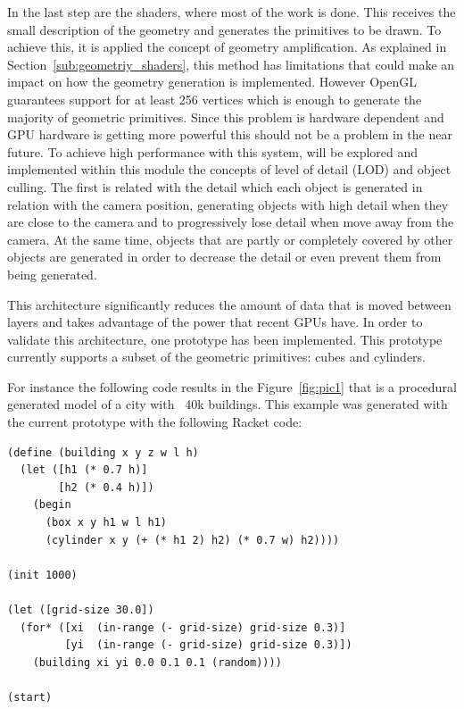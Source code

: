 In the last step are the shaders, where most of the work is done. This receives the small description of the geometry and generates the primitives to be
drawn. To achieve this, it is applied the concept of geometry amplification. As explained in Section~\ref{sub:geometriy_shaders}, this method has
limitations that could make an impact on how the geometry generation is implemented. However OpenGL guarantees support for at least 256 vertices which
is enough to generate the majority of geometric primitives. Since this problem is hardware dependent and GPU hardware is getting more powerful this
should not be a problem in the near future. 
To achieve high performance with this system, will be explored and implemented within this module the concepts of level of detail (LOD) and object
culling. The first is related with the detail which each object is generated in relation with the camera position, generating  objects with high detail
when they are close to the camera and to progressively lose detail when move away from the camera.  At the same time, objects that are partly or
completely covered by other objects are generated in order to decrease the detail or even prevent them from being generated.

This architecture significantly reduces the amount of data that is moved between layers and takes advantage of the power that recent GPUs have. 
In order to validate this architecture, one prototype has been implemented. This prototype currently supports a subset of the geometric primitives: cubes and cylinders.

For instance the following code results in the Figure~\ref{fig:pic1} that is a procedural generated model of a city with ~40k buildings. This example
was generated with the current prototype with the following Racket code:



\lstset{style=racket}
\begin{lstlisting}
(define (building x y z w l h)
  (let ([h1 (* 0.7 h)]
        [h2 (* 0.4 h)])
    (begin
      (box x y h1 w l h1)
      (cylinder x y (+ (* h1 2) h2) (* 0.7 w) h2))))

(init 1000)

(let ([grid-size 30.0])
  (for* ([xi  (in-range (- grid-size) grid-size 0.3)]
         [yi  (in-range (- grid-size) grid-size 0.3)])
    (building xi yi 0.0 0.1 0.1 (random))))

(start)
\end{lstlisting}


